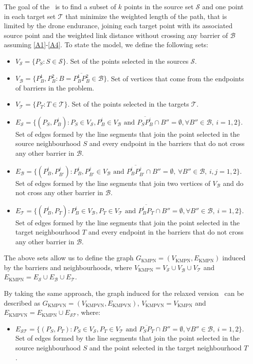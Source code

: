 \documentclass[a4paper,  review, authoryear, 1p.]{elsarticle}
\newcommand{\KMPN}{{\sf{H-KMPN}}}
\newcommand{\KMPVN}{{\sf{H-KMPVN}\xspace }}
\newcommand{\B}{{\mathcal B}}
\newcommand{\VB}{{V^{}_{\mathcal B}}}
\newcommand{\EB}{{E^{}_{\mathcal B}}}
\newcommand{\VS}{{V^{}_{\mathcal S}}}
\newcommand{\ES}{{E^{}_{\mathcal S}}}
\newcommand{\VT}{{V^{}_{\mathcal T}}}
\newcommand{\ET}{{E^{}_{\mathcal T}}}
\newcommand{\EST}{{E^{}_{\mathcal S\mathcal T}}}
\newcommand{\GKMPN}{{G_{\text{KMPN}}}}
\newcommand{\VKMPN}{{V_{\text{KMPN}}}}
\newcommand{\EKMPN}{{E_{\text{KMPN}}}}
\newcommand{\GKMPVN}{{G_{\text{KMPVN}}}}
\newcommand{\VKMPVN}{{V_{\text{KMPVN}}}}
\newcommand{\EKMPVN}{{E_{\text{KMPVN}}}}
\newcommand{\CV}[1]{{\color{atomictangerine}#1}}
\begin{document}
	The goal of the \KMPN \ is to find a subset of $k$ points in the source set $\mathcal S$ and one point in each target set $\mathcal T$ that minimize the weighted length of the path\CV{, that is limited by the drone endurance,} joining each target point with its associated source point \CV{and the weighted link distance} without crossing any barrier of $\mathcal B$ assuming \ref{A1}-\ref{A4}. To state the model, we define the following sets:
	\begin{itemize}
		\item $\VS=\{P_S:S\in\mathcal S\}$. Set of the points selected in the sources $\mathcal S$.
		\item $\VB=\{P^1_B, P^2_B:B=\overline{P^1_B P^2_B}\in \mathcal B\}$. Set of vertices that come from the endpoints of barriers in the problem.
		\item $\VT=\{P^{}_T:T\in\mathcal T\}$. Set of the points selected in the targets $\mathcal T$.
		\item $\ES=\{(P_S, P^i_{B}):P_S\in\VS, P^i_B\in V_\B\text{ and } \overline{P_SP^i_B}\cap B''=\emptyset,\forall B''\in\B,\:i=1,2\}$. Set of edges formed by the line segments that join the point selected in the source neighbourhood $S$ and every endpoint in the barriers that do not cross any other barrier in $\B$.
		\item $\EB=\{(P^{i}_B, P^{j}_{B'}):P^i_B, P^j_{B'}\in \VB \text{ and } \overline{P^i_B P^j_{B'}}\cap B''=\emptyset,\:\forall B''\in\mathcal B,\:i, j=1,2\}$. Set of edges formed by the line segments that join two vertices of $V_{\mathcal B}$ and do not cross any other barrier in $\B$.
		\item $\ET=\{(P^i_{B}, P^{}_T):P^i_B\in V_\B, P_T\in\VT\text{ and } \overline{P^i_BP^{}_T}\cap B''=\emptyset,\forall B''\in\B,\:i=1,2\}$. Set of edges formed by the line segments that join the point selected in the target neighbourhood $T$ and every endpoint in the barriers that do not cross any other barrier in $\B$.
	\end{itemize} 

	The above sets allow us to define the graph $\GKMPN= (\VKMPN, \EKMPN)$ induced by the barriers and neighbourhoods, where $\VKMPN=\VS\cup \VB\cup\VT$ and $\EKMPN=\ES\cup\EB \cup\ET$. 
	
	By taking the same approach, the graph induced for the relaxed version \KMPVN \ can be described as $\GKMPVN= (\VKMPVN, \EKMPVN)$, $\VKMPVN= \VKMPN$ and $\EKMPVN=\EKMPN\cup \EST$, where:
	\begin{itemize}
		\item $\EST=\{(P_S, P_T):P_S\in\VS, P_T\in\VT \text{ and } \overline{P_SP_T}\cap B''=\emptyset,\forall B''\in\B,\:i=1,2\}$. Set of edges formed by the line segments that join the point selected in the source neighbourhood $S$ and the point selected in the target neighbourhood $T$.
	\end{itemize}
\end{document}
